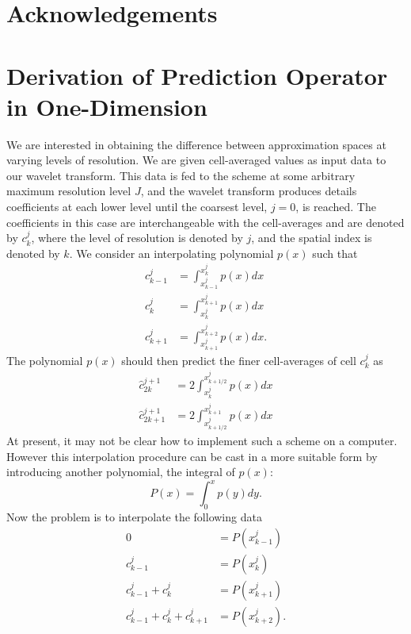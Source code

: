 \documentclass{article}
\begin{document}
\section{Acknowledgements}

\appendix

\section{Derivation of Prediction Operator in One-Dimension}
We are interested in obtaining the difference between approximation spaces at varying levels of resolution. We 
are given cell-averaged values as input data to our wavelet transform. This data is fed to the scheme at some arbitrary maximum
resolution level $J$, and the wavelet transform produces details coefficients at each lower level until the coarsest level,
$j=0$, is reached. The coefficients in this case are interchangeable with the cell-averages and are denoted by $c^{j}_{k}$,
where the level of resolution is denoted by $j$, and the spatial index is denoted by $k$. We consider an interpolating
polynomial $p(x)$ such that 
\begin{align}
    c^{j}_{k-1} &= \int_{x^{j}_{k-1}}^{x^{j}_{k}} p(x) dx \\
    c^{j}_{k} &= \int_{x^{j}_{k}}^{x^{j}_{k+1}} p(x) dx \\
    c^{j}_{k+1} &= \int_{x^{j}_{k+1}}^{x^{j}_{k+2}} p(x) dx.
\end{align}
The polynomial $p(x)$ should then predict the finer cell-averages of cell $c^{j}_{k}$ as
\begin{align}
    \hat{c}^{j+1}_{2k} &= 2 \int_{x^{j}_{k}}^{x^{j}_{k+1/2}} p(x) dx \\
    \hat{c}^{j+1}_{2k+1} &= 2 \int_{x^{j}_{k+1/2}}^{x^{j}_{k+1}} p(x) dx
\end{align}
At present, it may not be clear how to implement such a scheme on a computer. However this interpolation procedure
can be cast in a more suitable form by introducing another polynomial, the integral of $p(x)$:
\begin{equation}
	P(x) = \int_{0}^{x} p(y) dy.
\end{equation}
Now the problem is to interpolate the following data
\begin{align}
    0 &= P(x^{j}_{k-1}) \\
    c^{j}_{k-1} &= P(x^{j}_{k}) \\
    c^{j}_{k-1} + c^{j}_{k} &= P(x^{j}_{k+1}) \\
    c^{j}_{k-1} + c^{j}_{k} + c^{j}_{k+1} &= P(x^{j}_{k+2}).
\end{align}
\end{document}
